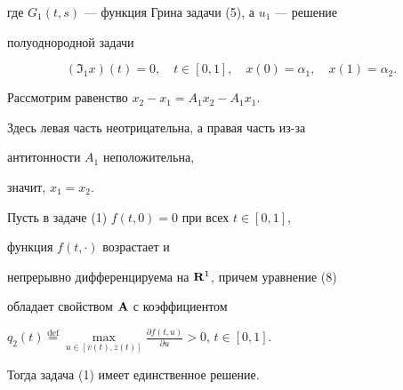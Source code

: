 \begin{pf}
где $G_1(t,s)$ --- функция Грина задачи (5), а $u_1$ --- решение


полуоднородной задачи


$$


({\Im}_1x)(t)=0,


\quad t\in[0,1],\quad x(0)=\alpha_1, \quad x(1)=\alpha_2.


$$





Рассмотрим равенство $x_2-x_1=A_1x_2-A_1x_1$.


Здесь левая часть неотрицательна, а правая часть из-за


антитонности $A_1$ неположительна,


значит, $x_1=x_2$.


\end{pf}





\begin{cornonum}


Пусть в задаче (1)\; $f(t,0)=0$ при всех $t\in[0,1]$,


функция $f(t,\cdot)$ возрастает и


непрерывно дифференцируема на $\bold R^1$, причем уравнение (8)


обладает свойством $\bold A$ с коэффициентом


$q_2(t)\overset{\mathrm{def}}{=}{}


\max\limits_{u\in [\overline {v}(t),\overline {z}(t)]}


\frac{\partial f(t,u)}{\partial u}>0$, $t\in[0,1]$.


Тогда задача (1) имеет единственное решение.


\end{cornonum}





